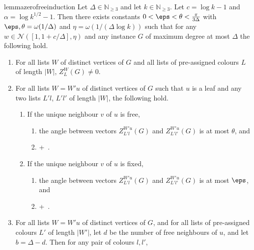 \begin{restatable}{lemma}{zerofreeinduction}
\label{lem:kcol}
Let $\Delta\in \mathbb{N}_{\geq 3}$ and let $k\in \mathbb{N}_{\geq 3}$.  
Let $c=\log k-1$ and $\alpha=\log k^{1/2}-1$.
Then there exists constants $0<\eps<\theta<\frac{\pi}{3\Delta}$ with $\eps,\theta=\omega(1/\Delta)$ and $\eta=\omega(1/(\Delta\log k))$ such that for any $w\in \mathcal{N}([1,1+c/\Delta],\eta)$ and any \UG[k] instance $G$ of maximum degree at most $\Delta$
the following hold.
\begin{enumerate}
 \item\label{itm:kcol,nonzero}
 For all lists $W$ of distinct vertices of $G$ and all lists of pre-assigned colours $L$ of length $|W|$, $Z_L^W(G) \ne 0$.
 \item\label{itm:kcol,leaf}
 For all lists $W=W'u$ of distinct vertices of $G$ such that $u$ is a leaf and any two lists $L'l$, $L'l'$ of length $|W|$, the following hold.
 \begin{enumerate}
 \item\label{itm:kcol,leaf,free}
 If the unique neighbour $v$ of $u$ is free,
 \begin{enumerate}
 \item\label{itm:kcol,leaf,free,angle}
  the angle between vectors $Z_{L'l}^{W'u}(G)$ and $Z_{L'l'}^{W'u}(G)$ is at most $\theta$, and
 \item\label{itm:kcol,leaf,free,length}
       \begin{itemeq}
              + \frac{\alpha}{\Delta}\,.
       \end{itemeq}
 \end{enumerate}
 \item\label{itm:kcol,leaf,fixed}
 If the unique neighbour $v$ of $u$ is fixed,
 \begin{enumerate}
 \item\label{itm:kcol,leaf,fixed,angle}
 the angle between vectors $Z_{L'l}^{W'u}(G)$ and $Z_{L'l'}^{W'u}(G)$ is at most $\eps$, and
 \item\label{itm:kcol,leaf,fixed,length} 
       \begin{itemeq}
              + \,.
       \end{itemeq}
 \end{enumerate}
 \end{enumerate}
 \item\label{itm:kcol,nonleaf}
 For all lists $W = W'u$ of distinct vertices of $G$, and for all lists of pre-assigned colours $L'$ of length $|W'|$, let $d$ be the number of free neighbours of $u$, and let $b=\Delta-d$. Then for any pair of colours $l,l'$,

\end{enumerate}
\end{restatable}
